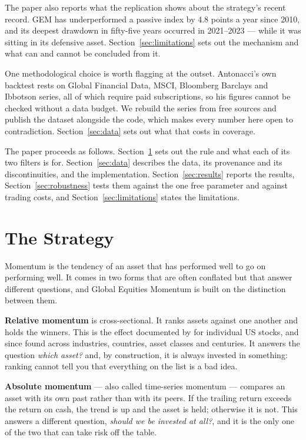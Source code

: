 \documentclass[11pt,a4paper]{article}
\let\oldsection\section
\renewcommand{\section}{\FloatBarrier\oldsection}
\begin{document}
The paper also reports what the replication shows about the strategy's recent
record. GEM has underperformed a passive index by 4.8 points a year since 2010,
and its deepest drawdown in fifty-five years occurred in 2021--2023 --- while
it was sitting in its defensive asset. Section~\ref{sec:limitations} sets out
the mechanism and what can and cannot be concluded from it.

One methodological choice is worth flagging at the outset. Antonacci's own
backtest rests on Global Financial Data, MSCI, Bloomberg Barclays and Ibbotson
series, all of which require paid subscriptions, so his figures cannot be
checked without a data budget. We rebuild the series from free sources and
publish the dataset alongside the code, which makes every number here open to
contradiction. Section~\ref{sec:data} sets out what that costs in coverage.

The paper proceeds as follows. Section~\ref{sec:strategy} sets out the rule and
what each of its two filters is for. Section~\ref{sec:data} describes the data,
its provenance and its discontinuities, and the implementation.
Section~\ref{sec:results} reports the results, Section~\ref{sec:robustness}
tests them against the one free parameter and against trading costs, and
Section~\ref{sec:limitations} states the limitations.

\section{The Strategy}
\label{sec:strategy}

Momentum is the tendency of an asset that has performed well to go on
performing well. It comes in two forms that are often conflated but that answer
different questions, and Global Equities Momentum is built on the distinction
between them.

\textbf{Relative momentum} is cross-sectional. It ranks assets against one
another and holds the winners. This is the effect documented by
\citet{jegadeesh1993} for individual US stocks, and since found across
industries, countries, asset classes and centuries. It answers the question
\emph{which asset?} and, by construction, it is always invested in something:
ranking cannot tell you that everything on the list is a bad idea.

\textbf{Absolute momentum} --- also called time-series momentum
\citep{moskowitz2012} --- compares an asset with its own past rather than with
its peers. If the trailing return exceeds the return on cash, the trend is up
and the asset is held; otherwise it is not. This answers a different question,
\emph{should we be invested at all?}, and it is the only one of the two that
can take risk off the table.
\end{document}
